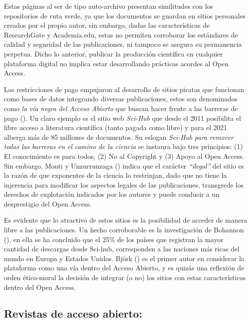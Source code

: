 \documentclass[
  spanish,
  a4paper,
  oneside]{scrbook}
\begin{document}
Estas páginas al ser de tipo auto-archivo presentan similitudes con los
repositorios de ruta verde, ya que los documentos se guardan en sitios
personales creados por el propio autor, sin embargo, dadas las
características de ResearchGate y Academia.edu, estas no permiten
corroborar los estándares de calidad y seguridad de las publicaciones,
ni tampoco se asegura su permanencia perpetua. Dicho lo anterior,
publicar la producción científica en cualquier plataforma digital no
implica estar desarrollando prácticas acordes al Open Access.

Las restricciones de pago empujaron al desarrollo de sitios piratas que
funcionan como bases de datos integrando diversas publicaciones, estos
son denominados como \emph{la vía negra del Acceso Abierto} que buscan
hacer frente a las barreras de pago
(). Un claro ejemplo es el
sitio web \emph{Sci-Hub} que desde el 2011 posibilita el libre acceso a
literatura científica (tanto pagada como libre) y para el 2021 alberga
más de 85 millones de documentos. Su eslogan \emph{Sci-Hub para remover
todas las barreras en el camino de la ciencia} se instaura bajo tres
principios: (1) El conocimiento es para todos, (2) No al Copyright y (3)
Apoyo al Open Access. Sin embargo, Monti y Unzurrunzaga
() indica que el carácter
\emph{``ilegal''} del sitio es la razón de que exponentes de la ciencia
lo restrinjan, dado que no tiene la injerencia para modificar los
aspectos legales de las publicaciones, transgrede los derechos de
explotación indicados por los autores y puede conducir a un desprestigio
del Open Access.

Es evidente que lo atractivo de estos sitios es la posibilidad de
acceder de manera libre a las publicaciones. Un hecho corroborable es la
investigación de Bohannon (), en
ella se ha concluido que el 25\% de los países que registran la mayor
cantidad de descargas desde Sci-hub, corresponden a las naciones más
ricas del mundo en Europa y Estados Unidos. Björk
() es el primer autor en considerar
la plataforma como una vía dentro del Acceso Abierto, y es quizás una
reflexión de orden ético-moral la decisión de integrar (o no) los sitios
con estas características dentro del Open Access.

\subsection{Revistas de acceso
abierto:}\label{revistas-de-acceso-abierto}
\end{document}
